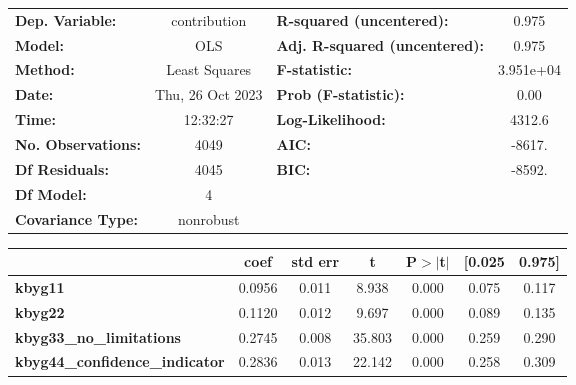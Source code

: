 \begin{center}
\begin{tabular}{lclc}
\toprule
\textbf{Dep. Variable:}                &   contribution   & \textbf{  R-squared (uncentered):}      &     0.975   \\
\textbf{Model:}                        &       OLS        & \textbf{  Adj. R-squared (uncentered):} &     0.975   \\
\textbf{Method:}                       &  Least Squares   & \textbf{  F-statistic:       }          & 3.951e+04   \\
\textbf{Date:}                         & Thu, 26 Oct 2023 & \textbf{  Prob (F-statistic):}          &     0.00    \\
\textbf{Time:}                         &     12:32:27     & \textbf{  Log-Likelihood:    }          &    4312.6   \\
\textbf{No. Observations:}             &        4049      & \textbf{  AIC:               }          &    -8617.   \\
\textbf{Df Residuals:}                 &        4045      & \textbf{  BIC:               }          &    -8592.   \\
\textbf{Df Model:}                     &           4      & \textbf{                     }          &             \\
\textbf{Covariance Type:}              &    nonrobust     & \textbf{                     }          &             \\
\bottomrule
\end{tabular}
\begin{tabular}{lcccccc}
                                       & \textbf{coef} & \textbf{std err} & \textbf{t} & \textbf{P$> |$t$|$} & \textbf{[0.025} & \textbf{0.975]}  \\
\midrule
\textbf{kbyg11}                        &       0.0956  &        0.011     &     8.938  &         0.000        &        0.075    &        0.117     \\
\textbf{kbyg22}                        &       0.1120  &        0.012     &     9.697  &         0.000        &        0.089    &        0.135     \\
\textbf{kbyg33\_no\_limitations}       &       0.2745  &        0.008     &    35.803  &         0.000        &        0.259    &        0.290     \\
\textbf{kbyg44\_confidence\_indicator} &       0.2836  &        0.013     &    22.142  &         0.000        &        0.258    &        0.309     \\

\end{tabular}
\end{center}
